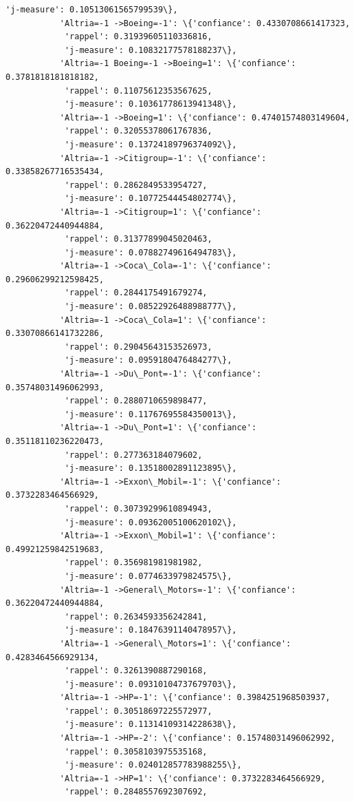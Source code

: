 \documentclass[11pt]{article}
\begin{document}
\begin{Verbatim}[commandchars=\\\{\}]
            'j-measure': 0.10513061565799539\},
           'Altria=-1 ->Boeing=-1': \{'confiance': 0.4330708661417323,
            'rappel': 0.31939605110336816,
            'j-measure': 0.10832177578188237\},
           'Altria=-1 Boeing=-1 ->Boeing=1': \{'confiance': 0.3781818181818182,
            'rappel': 0.11075612353567625,
            'j-measure': 0.10361778613941348\},
           'Altria=-1 ->Boeing=1': \{'confiance': 0.47401574803149604,
            'rappel': 0.32055378061767836,
            'j-measure': 0.13724189796374092\},
           'Altria=-1 ->Citigroup=-1': \{'confiance': 0.33858267716535434,
            'rappel': 0.2862849533954727,
            'j-measure': 0.10772544454802774\},
           'Altria=-1 ->Citigroup=1': \{'confiance': 0.36220472440944884,
            'rappel': 0.31377899045020463,
            'j-measure': 0.07882749616494783\},
           'Altria=-1 ->Coca\_Cola=-1': \{'confiance': 0.29606299212598425,
            'rappel': 0.2844175491679274,
            'j-measure': 0.08522926488988777\},
           'Altria=-1 ->Coca\_Cola=1': \{'confiance': 0.33070866141732286,
            'rappel': 0.29045643153526973,
            'j-measure': 0.0959180476484277\},
           'Altria=-1 ->Du\_Pont=-1': \{'confiance': 0.35748031496062993,
            'rappel': 0.2880710659898477,
            'j-measure': 0.11767695584350013\},
           'Altria=-1 ->Du\_Pont=1': \{'confiance': 0.35118110236220473,
            'rappel': 0.277363184079602,
            'j-measure': 0.13518002891123895\},
           'Altria=-1 ->Exxon\_Mobil=-1': \{'confiance': 0.3732283464566929,
            'rappel': 0.30739299610894943,
            'j-measure': 0.09362005100620102\},
           'Altria=-1 ->Exxon\_Mobil=1': \{'confiance': 0.49921259842519683,
            'rappel': 0.356981981981982,
            'j-measure': 0.0774633979824575\},
           'Altria=-1 ->General\_Motors=-1': \{'confiance': 0.36220472440944884,
            'rappel': 0.2634593356242841,
            'j-measure': 0.18476391140478957\},
           'Altria=-1 ->General\_Motors=1': \{'confiance': 0.4283464566929134,
            'rappel': 0.3261390887290168,
            'j-measure': 0.09310104737679703\},
           'Altria=-1 ->HP=-1': \{'confiance': 0.3984251968503937,
            'rappel': 0.30518697225572977,
            'j-measure': 0.11314109314228638\},
           'Altria=-1 ->HP=-2': \{'confiance': 0.15748031496062992,
            'rappel': 0.3058103975535168,
            'j-measure': 0.024012857783988255\},
           'Altria=-1 ->HP=1': \{'confiance': 0.3732283464566929,
            'rappel': 0.2848557692307692,

\end{Verbatim}
\end{document}
